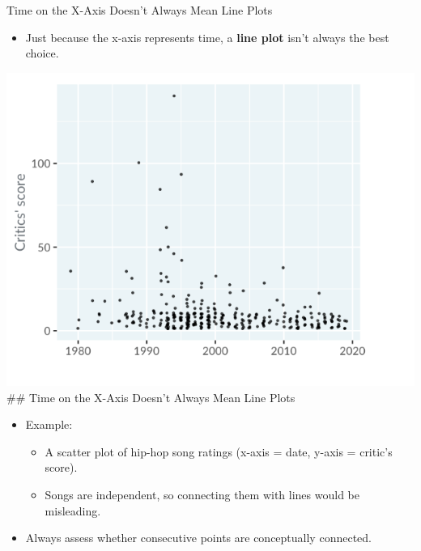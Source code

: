 \documentclass[
  ignorenonframetext,
]{beamer}
\providecommand{\tightlist}{%
  \setlength{\itemsep}{0pt}\setlength{\parskip}{0pt}}
\begin{document}
\begin{frame}{Time on the X-Axis Doesn't Always Mean Line Plots}
\label{time-on-the-x-axis-doesnt-always-mean-line-plots}
\begin{itemize}
\tightlist
\item
  Just because the x-axis represents time, a \textbf{line plot} isn't
  always the best choice.
\end{itemize}

\includegraphics{../images/im46.png} \#\# Time on the X-Axis Doesn't
Always Mean Line Plots

\begin{itemize}
\item
  Example:

  \begin{itemize}
  \item
    A scatter plot of hip-hop song ratings (x-axis = date, y-axis =
    critic's score).
  \item
    Songs are independent, so connecting them with lines would be
    misleading.
  \end{itemize}
\item
  Always assess whether consecutive points are conceptually connected.
\end{itemize}
\end{frame}
\end{document}
